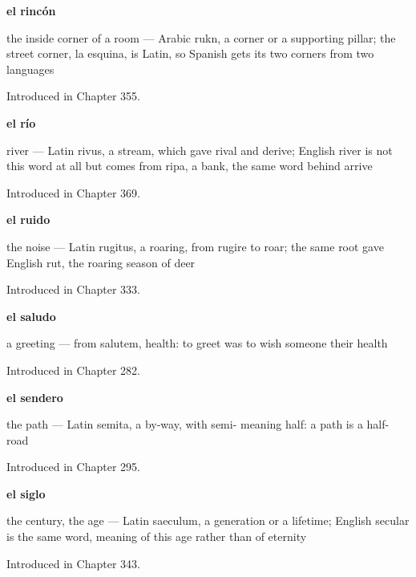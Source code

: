 \noindent\begin{minipage}[t]{\linewidth}
\raggedright
\textbf{el rincón}\par
\small the inside corner of a room — Arabic rukn, a corner or a supporting pillar; the street corner, la esquina, is Latin, so Spanish gets its two corners from two languages\par
\footnotesize Introduced in Chapter 355.
\end{minipage}\par\medskip

\noindent\begin{minipage}[t]{\linewidth}
\raggedright
\textbf{el río}\par
\small river — Latin rivus, a stream, which gave rival and derive; English river is not this word at all but comes from ripa, a bank, the same word behind arrive\par
\footnotesize Introduced in Chapter 369.
\end{minipage}\par\medskip

\noindent\begin{minipage}[t]{\linewidth}
\raggedright
\textbf{el ruido}\par
\small the noise — Latin rugitus, a roaring, from rugire to roar; the same root gave English rut, the roaring season of deer\par
\footnotesize Introduced in Chapter 333.
\end{minipage}\par\medskip

\noindent\begin{minipage}[t]{\linewidth}
\raggedright
\textbf{el saludo}\par
\small a greeting — from salutem, health: to greet was to wish someone their health\par
\footnotesize Introduced in Chapter 282.
\end{minipage}\par\medskip

\noindent\begin{minipage}[t]{\linewidth}
\raggedright
\textbf{el sendero}\par
\small the path — Latin semita, a by-way, with semi- meaning half: a path is a half-road\par
\footnotesize Introduced in Chapter 295.
\end{minipage}\par\medskip

\noindent\begin{minipage}[t]{\linewidth}
\raggedright
\textbf{el siglo}\par
\small the century, the age — Latin saeculum, a generation or a lifetime; English secular is the same word, meaning of this age rather than of eternity\par
\footnotesize Introduced in Chapter 343.
\end{minipage}\par\medskip

